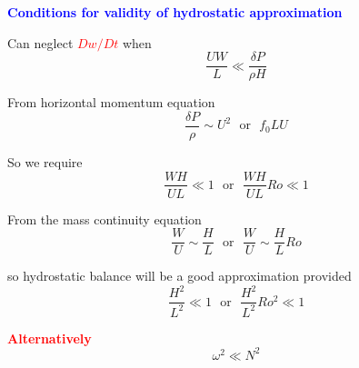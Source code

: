 \documentclass[a4]{seminar}
\newcommand{\R}[1]{\textcolor{red}{#1}}
\newcommand{\B}[1]{\textcolor{blue}{#1}}
\begin{document}
\begin{slide}

\B{\bf Conditions for validity of hydrostatic approximation}

\vspace{2mm}

Can neglect \R{\(Dw / Dt\)} when
\begin{displaymath}
\frac{UW}{L} \ll \frac{\delta P}{\rho H}
\end{displaymath}

From horizontal momentum equation
\begin{displaymath}
\frac{\delta P}{\rho} \sim U^2 \ \ \ \mathrm{or}\ \ \ f_0 L U
\end{displaymath}

So we require
\begin{displaymath}
\frac{WH}{UL} \ll 1 \ \ \ \mathrm{or}\ \ \ \frac{WH}{UL}Ro \ll 1
\end{displaymath}

\end{slide}


\begin{slide}

From the mass continuity equation
\begin{displaymath}
\frac{W}{U} \sim \frac{H}{L} \ \ \ \mathrm{or} \ \ \ \frac{W}{U} \sim \frac{H}{L}Ro
\end{displaymath}

so hydrostatic balance will be a good approximation provided
\begin{displaymath}
\frac{H^2}{L^2} \ll 1 \ \ \ \mathrm{or} \ \ \ \frac{H^2}{L^2}Ro^2 \ll 1
\end{displaymath}

\vspace{2mm}
\R{\bf Alternatively}
\begin{displaymath}
\omega^2 \ll N^2
\end{displaymath}


\end{slide}

\end{document}
